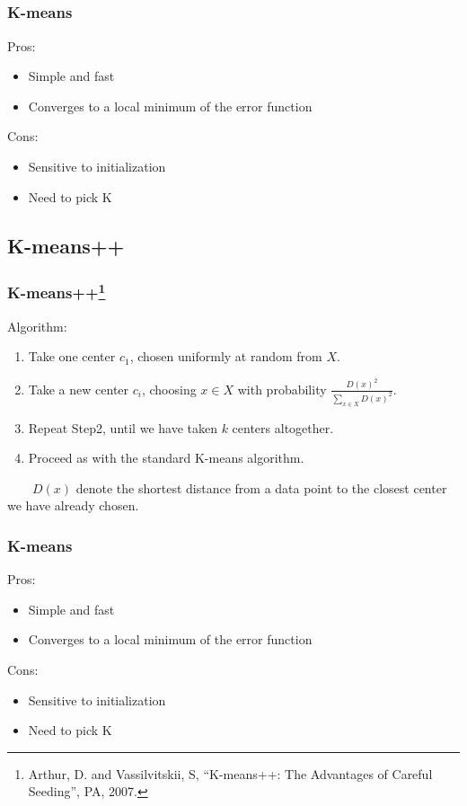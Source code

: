 \documentclass[notheorems,serif,table,compress]{beamer}  %
\begin{document}
\subsection{}
\begin{frame}
\frametitle{K-means}
{\color{blue}Pros:}
    \begin{itemize}
      \item Simple and fast
      \item Converges to a local minimum of the error function
    \end{itemize}
{\color{blue}Cons:}
    \begin{itemize}
    \item {\color{blue}Sensitive to initialization}
    \item Need to pick K
    \end{itemize}
\end{frame}

\subsection{K-means++}
\begin{frame}
\frametitle{K-means++\footnote{Arthur, D. and Vassilvitskii, S, ``K-means++: The Advantages of Careful Seeding'', PA, 2007.}}
{\color{blue}Algorithm:}
    \begin{enumerate}
      \item Take one center $c_{1}$, chosen uniformly at random from $X$.
      \item Take a new center $c_{i}$, choosing $x \in X$ with probability $\frac{D(x)^{2}}{\sum_{x \in X}D(x)^{2}}$.
      \item Repeat Step2, until we have taken $k$ centers altogether.
      \item Proceed as with the standard K-means algorithm.\newline
      
    \end{enumerate}
    ~~~~$D(x)$ denote the shortest distance from a data point to the closest center we have already chosen.
\end{frame}

\begin{frame}
\frametitle{K-means}
{\color{blue}Pros:}
    \begin{itemize}
      \item Simple and fast
      \item Converges to a local minimum of the error function
    \end{itemize}
{\color{blue}Cons:}
    \begin{itemize}
    \item Sensitive to initialization 
    \item {\color{blue}Need to pick K}
    \end{itemize}
\end{frame}
\end{document}
